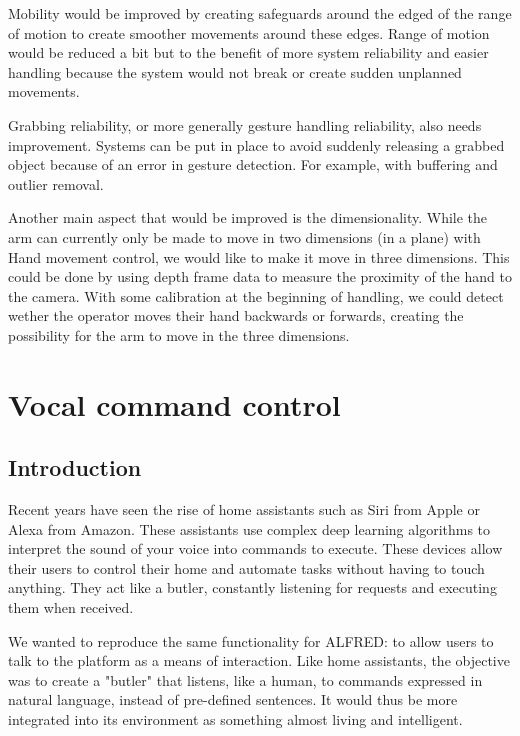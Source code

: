 Mobility would be improved by creating safeguards around the edged of the range of motion to create smoother movements around these edges. Range of motion would be reduced a bit but to the benefit of more system reliability and easier handling because the system would not break or create sudden unplanned movements.

Grabbing reliability, or more generally gesture handling reliability, also needs improvement. Systems can be put in place to avoid suddenly releasing a grabbed object because of an error in gesture detection. For example, with buffering and outlier removal.

Another main aspect that would be improved is the dimensionality. While the arm can currently only be made to move in two dimensions (in a plane) with Hand movement control, we would like to make it move in three dimensions. This could be done by using depth frame data to measure the proximity of the hand to the camera. With some calibration at the beginning of handling, we could detect wether the operator moves their hand backwards or forwards, creating the possibility for the arm to move in the three dimensions.



\section{Vocal command control}


\subsection{Introduction}

Recent years have seen the rise of home assistants such as Siri from Apple or Alexa from Amazon. These assistants use complex deep learning algorithms to interpret the sound of your voice into commands to execute. These devices allow their users to control their home and automate tasks without having to touch anything. They act like a butler, constantly listening for requests and executing them when received.

We wanted to reproduce the same functionality for ALFRED: to allow users to talk to the platform as a means of interaction. Like home assistants, the objective was to create a "butler" that listens, like a human, to commands expressed in natural language, instead of pre-defined sentences. It would thus be more integrated into its environment as something almost living and intelligent.


